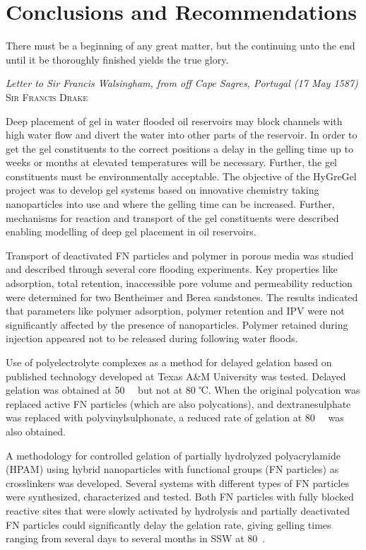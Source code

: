\chapter{Conclusions and Recommendations}
\vspace*{\fill}
\epigraph{There must be a beginning of any great matter, but the continuing unto the end until it be thoroughly finished yields the true glory.}%
{\textit{Letter to Sir Francis Walsingham, from off Cape Sagres, Portugal (17 May 1587)} \textsc{Sir Francis Drake}}
\clearpage{\thispagestyle{empty}\cleardoublepage}
Deep placement of gel in water flooded oil reservoirs may block channels with high water flow and divert the water into other parts of the reservoir. In order to get the gel constituents to the correct positions a delay in the gelling time up to weeks or months at elevated temperatures will be necessary. Further, the gel constituents must be environmentally acceptable. The objective of the HyGreGel project was to develop gel systems based on innovative chemistry taking nanoparticles into use and where the gelling time can be increased. Further, mechanisms for reaction and transport of the gel constituents were described enabling modelling of deep gel placement in oil reservoirs.

Transport of deactivated FN particles and polymer in porous media was studied and described through several core flooding experiments. Key properties like adsorption, total retention, inaccessible pore volume and permeability reduction were determined for two Bentheimer and Berea sandstones. The results indicated that parameters like polymer adsorption, polymer retention and IPV were not significantly affected by the presence of nanoparticles. Polymer retained during injection appeared not to be released during following water floods.

Use of polyelectrolyte complexes as a method for delayed gelation based on published
technology developed at Texas A\&M University was tested. Delayed gelation was obtained at 50~\celsius~ but not at 80 ℃. When the original polycation was replaced  
active FN particles (which are also polycations), and dextranesulphate was replaced with polyvinylsulphonate, a reduced rate of gelation at 80~\celsius~ was also obtained.  

A methodology for controlled gelation of partially hydrolyzed polyacrylamide (HPAM) using hybrid nanoparticles with functional groups (FN particles) as crosslinkers was developed. Several systems with different types of FN particles were synthesized, characterized and tested. Both FN particles with fully blocked reactive sites that were slowly activated by hydrolysis and partially deactivated FN particles could significantly delay the gelation rate, giving gelling times ranging from several days to several months in SSW at 80~\celsius.

